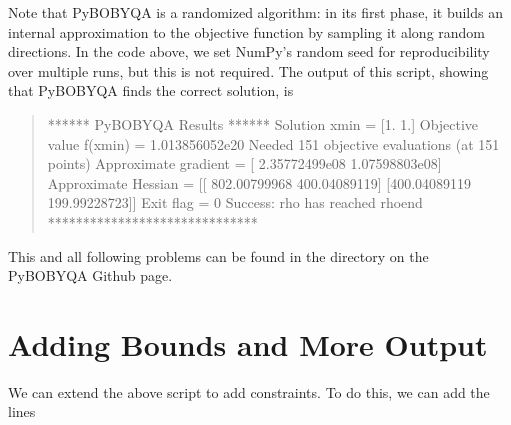 \documentclass[letterpaper,10pt,english]{sphinxmanual}
\begin{document}
Note that Py\sphinxhyphen{}BOBYQA is a randomized algorithm: in its first phase, it builds an internal approximation to the objective function by sampling it along random directions. In the code above, we set NumPy’s random seed for reproducibility over multiple runs, but this is not required. The output of this script, showing that Py\sphinxhyphen{}BOBYQA finds the correct solution, is
\begin{quote}

\begin{sphinxVerbatim}[commandchars=\\\{\}]
****** Py\PYGZhy{}BOBYQA Results ******
Solution xmin = [1. 1.]
Objective value f(xmin) = 1.013856052e\PYGZhy{}20
Needed 151 objective evaluations (at 151 points)
Approximate gradient = [ 2.35772499e\PYGZhy{}08 \PYGZhy{}1.07598803e\PYGZhy{}08]
Approximate Hessian = [[ 802.00799968 \PYGZhy{}400.04089119]
 [\PYGZhy{}400.04089119  199.99228723]]
Exit flag = 0
Success: rho has reached rhoend
******************************
\end{sphinxVerbatim}
\end{quote}

This and all following problems can be found in the  directory on the Py\sphinxhyphen{}BOBYQA Github page.


\section{Adding Bounds and More Output}
\label{\detokenize{userguide:adding-bounds-and-more-output}}
We can extend the above script to add constraints. To do this, we can add the lines
\begin{quote}

\begin{sphinxVerbatim}[commandchars=\\\{\}]
  \PYG{p}{[} \PYG{p}{]}
  \PYG{p}{[} \PYG{p}{]}

    
\end{sphinxVerbatim}
\end{quote}
\end{document}
